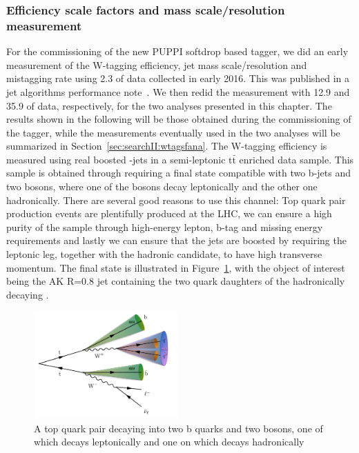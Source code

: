 \subsubsection{Efficiency scale factors and mass scale/resolution measurement} 
For the commissioning of the new PUPPI softdrop based tagger, we did an early measurement of the W-tagging efficiency, jet mass scale/resolution and mistagging rate using 2.3 \fbinv of data collected in early 2016. This was published in a jet algorithms performance note~\cite{CMS-PAS-JME-16-003}. We then redid the measurement with 12.9 and 35.9 \fbinv of data, respectively, for the two analyses presented in this chapter. The results shown in the following will be those obtained during the commissioning of the tagger, while the measurements eventually used in the two analyses will be summarized in Section~\ref{sec:searchII:wtagsfana}.
The W-tagging efficiency is measured using real boosted \PW-jets in a semi-leptonic $\textrm{t}\bar{\textrm{t}}$ enriched data sample. This sample is obtained through requiring a final state compatible with two b-jets and two \PW bosons, where one of the bosons decay leptonically and the other one hadronically. There are several good reasons to use this channel: Top quark pair production events are plentifully produced at the LHC, we can ensure a high purity of the sample through high-energy lepton, b-tag and missing energy requirements and lastly we can ensure that the \PW jets are boosted by requiring the leptonic leg, together with the hadronic \PW candidate, to have high transverse momentum. The final state is illustrated in Figure~\ref{fig:search2:ttsemilep}, with the object of interest being the AK R=0.8 jet containing the two quark daughters of the hadronically decaying \PW.
\begin{figure}[htbp]
\centering
\includegraphics[width=0.49\textwidth]{figures/analysis/search2/misc/semileptt.pdf}
\caption{A top quark pair decaying into two b quarks and two \PW bosons, one of which decays leptonically and one on which decays hadronically}
\label{fig:search2:ttsemilep}
\end{figure}
